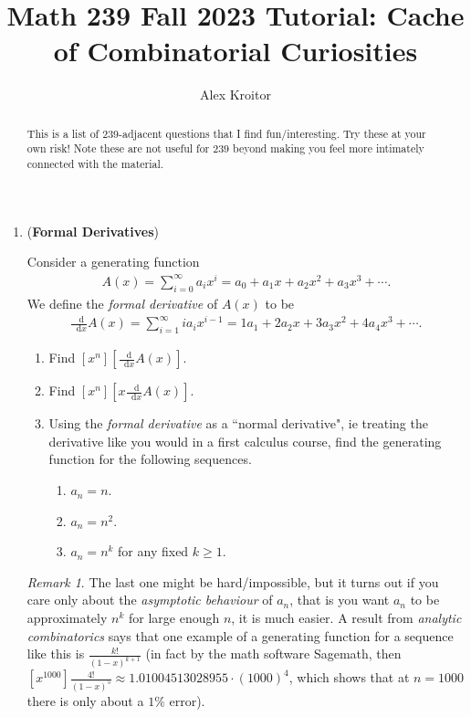 \documentclass{article}
\title{Math 239 Fall 2023 Tutorial: Cache of Combinatorial Curiosities}
\author{Alex Kroitor}
\newcommand{\question}[1]{\item (\textbf{#1})}
\newcommand{\dif}{\mathop{}\!\mathrm{d}}
\theoremstyle{remark}
\newtheorem*{remark}{Remark}
\begin{document}
\maketitle

\begin{abstract}
    This is a list of 239-adjacent questions that I find fun/interesting. Try these at your own risk! Note these are not useful for $239$ beyond making you feel more intimately connected with the material.
\end{abstract}

\begin{enumerate}
    \question{Formal Derivatives}

    Consider a generating function
    \begin{align*}
        A(x) = \sum_{i=0}^\infty a_i x^i = a_0 + a_1 x + a_2 x^2 + a_3 x^3 + \cdots.
    \end{align*}
    We define the \textit{formal derivative} of $A(x)$ to be
    \begin{align*}
        \frac{\dif}{ \dif x} A(x) = \sum_{i = 1}^\infty i a_i x^{i-1} = 1 a_1 + 2 a_2 x + 3 a_3 x^2 + 4 a_4 x^3 + \cdots.
    \end{align*}
    \begin{enumerate}
        \item Find $[x^n] \left[ \frac{\dif}{\dif x} A(x) \right]$.
        \item Find $[x^n] \left[ x \frac{\dif }{\dif x} A(x)  \right]$.
        \item Using the \textit{formal derivative} as a ``normal derivative", ie treating the derivative like you would in a first calculus course, find the generating function for the following sequences.
        \begin{enumerate}
            \item $a_n = n$.
            \item $a_n = n^2$.
            \item $a_n = n^k$ for any fixed $k \geq 1$.
        \end{enumerate}
    \end{enumerate}
    \begin{remark}
        The last one might be hard/impossible, but it turns out if you care only about the \textit{asymptotic behaviour} of $a_n$, that is you want $a_n$ to be approximately $n^k$ for large enough $n$, it is much easier. A result from \textit{analytic combinatorics} says that one example of a generating function for a sequence like this is $\frac{k!}{(1-x)^{k+1}}$ (in fact by the math software Sagemath, then $[x^{1000}] \frac{4!}{(1-x)^5} \approx 1.01004513028955 \cdot (1000)^4$, which shows that at $n=1000$ there is only about a $1 \%$ error).
    \end{remark}


\end{enumerate}
\end{document}

